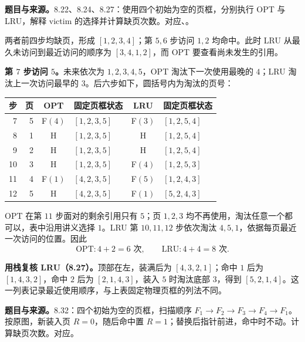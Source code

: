 \textbf{题目与来源。}8.22、8.24、8.27：使用四个初始为空的页框，分别执行 OPT 与 LRU，解释 victim 的选择并计算缺页次数。对应、。

\begin{checkedsolution}
两者前四步均缺页，形成 $[1,2,3,4]$；第 $5,6$ 步访问 $1,2$ 均命中。此时 LRU 从最久未访问到最近访问的顺序为 $[3,4,1,2]$，而 OPT 要查看尚未发生的引用。

\textbf{第 $7$ 步访问 $5$。}未来依次为 $1,2,3,4,5$，OPT 淘汰下一次使用最晚的 $4$；LRU 淘汰上一次访问最早的 $3$。后六步如下，圆括号内为淘汰的页号：
\begin{center}
\small
\begin{tabular}{@{}rrclcl@{}}
\toprule
步 & 页 & OPT & 固定页框状态 & LRU & 固定页框状态 \\
\midrule
7  & 5 & F$(4)$ & $[1,2,3,5]$ & F$(3)$ & $[1,2,5,4]$ \\
8  & 1 & H & $[1,2,3,5]$ & H & $[1,2,5,4]$ \\
9  & 2 & H & $[1,2,3,5]$ & H & $[1,2,5,4]$ \\
10 & 3 & H & $[1,2,3,5]$ & F$(4)$ & $[1,2,5,3]$ \\
11 & 4 & F$(1)$ & $[4,2,3,5]$ & F$(5)$ & $[1,2,4,3]$ \\
12 & 5 & H & $[4,2,3,5]$ & F$(1)$ & $[5,2,4,3]$ \\
\bottomrule
\end{tabular}
\end{center}
OPT 在第 $11$ 步面对的剩余引用只有 $5$；页 $1,2,3$ 均不再使用，淘汰任意一个都可以，表中沿用讲义选择 $1$。LRU 第 $10,11,12$ 步依次淘汰 $4,5,1$，依据每页最近一次访问的位置。因此
\[
 \boxed{\mathrm{OPT}:4+2=6\text{ 次}},\qquad
 \boxed{\mathrm{LRU}:4+4=8\text{ 次}}.
\]

\textbf{用栈复核 LRU（8.27）。}顶部在左，装满后为 $[4,3,2,1]$；命中 $1$ 后为 $[1,4,3,2]$，命中 $2$ 后为 $[2,1,4,3]$，装入 $5$ 时淘汰底部 $3$，得到 $[5,2,1,4]$。这一列表记录最近使用顺序，与上表固定物理页框的列法不同。
\end{checkedsolution}

\textbf{题目与来源。}8.32：四个初始为空的页框，扫描顺序 $F_1\to F_2\to F_3\to F_4\to F_1$。按原图，新装入页 $R=0$，随后命中置 $R=1$；替换后指针前进，命中时不动。计算缺页次数。对应。

